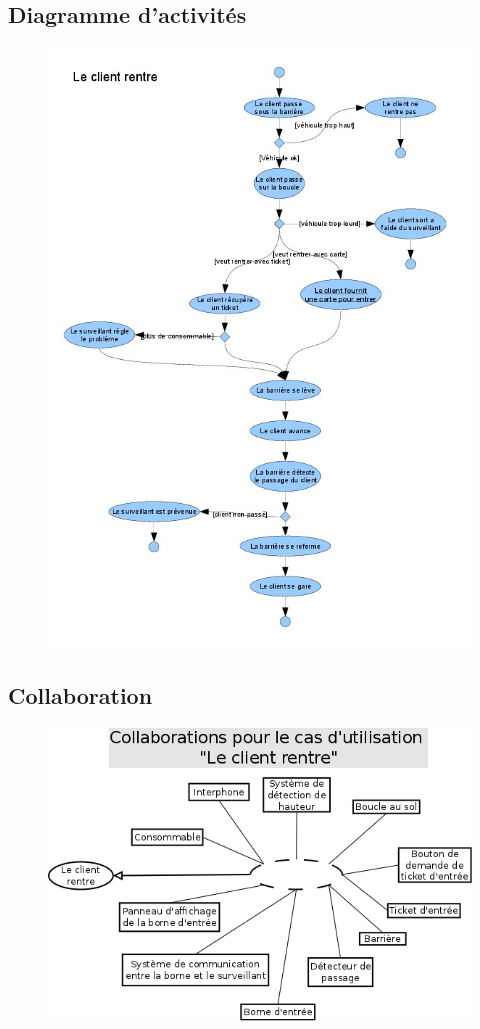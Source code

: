 \documentclass[a4paper]{article}
\begin{document}
\newpage
\subsection{Diagramme d'activit\'es}
\begin{figure}[!ht]
\centering
\includegraphics[scale=.7]{imgs/act_rentre.jpg}
\end{figure}
\newpage

\subsection{Collaboration}
\begin{figure}[!ht]
\centering
\includegraphics[scale=.5]{collaborations/_rentre.png}
\end{figure}
\end{document}
